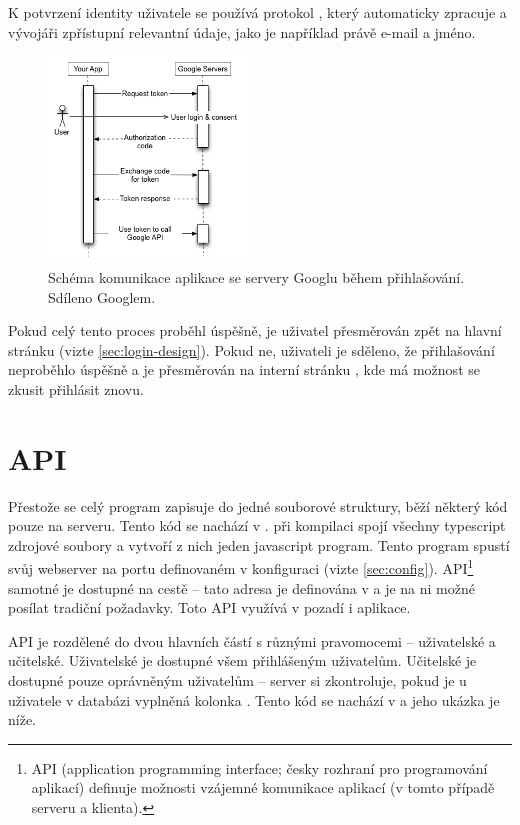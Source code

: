 K potvrzení identity uživatele se používá protokol , který  automaticky zpracuje a vývojáři zpřístupní relevantní údaje, jako je například právě e-mail a jméno.

\begin{figure}[H]
    \centering
    \includegraphics[width=200px]{images/02technologie/google-auth.png}
    \caption{Schéma komunikace aplikace se servery Googlu během přihlašování. Sdíleno Googlem. \cite{google-auth}}
\end{figure}

Pokud celý tento proces proběhl úspěšně, je uživatel přesměrován zpět na hlavní stránku (vizte \ref{sec:login-design}). Pokud ne, uživateli je sděleno, že přihlašování neproběhlo úspěšně a je přesměrován na interní stránku , kde má možnost se zkusit přihlásit znovu.

\section{API}
\label{api}

Přestože se celý program zapisuje do jedné souborové struktury, běží některý kód pouze na serveru. Tento kód se nachází v .  při kompilaci spojí všechny typescript zdrojové soubory a vytvoří z nich jeden javascript program. Tento program spustí svůj webserver na portu definovaném v konfiguraci (vizte \ref{sec:config}). API\footnote{API (application programming interface; česky rozhraní pro programování aplikací) definuje možnosti vzájemné komunikace aplikací (v tomto případě serveru a klienta).} samotné je dostupné na cestě  -- tato adresa je definována v  a je na ni možné posílat tradiční  požadavky. Toto API využívá v pozadí i aplikace.

API je rozdělené do dvou hlavních částí s různými pravomocemi -- uživatelské a učitelské. Uživatelské je dostupné všem přihlášeným uživatelům. Učitelské je dostupné pouze oprávněným uživatelům -- server si zkontroluje, pokud je u uživatele v databázi vyplněná kolonka . Tento kód se nachází v  a jeho ukázka je níže.

